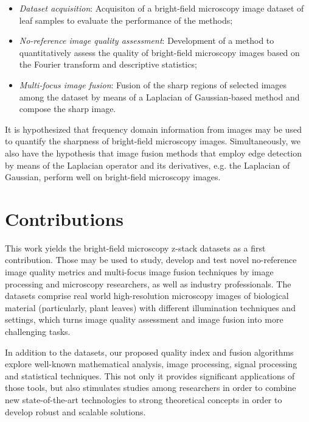\begin{itemize}
    \item \emph{Dataset acquisition}: Acquisiton of a bright-field microscopy image dataset of leaf samples to evaluate the performance of the methods;

    \item \emph{No-reference image quality assessment}: Development of a method to quantitatively assess the quality of bright-field microscopy images based on the Fourier transform and descriptive statistics; 
    
    \item \emph{Multi-focus image fusion}: Fusion of the sharp regions of selected images among the dataset by means of a Laplacian of Gaussian-based method and compose the sharp image.
    
\end{itemize}

It is hypothesized that frequency domain information from images may be used to quantify the sharpness of bright-field microscopy images. Simultaneously, we also have the hypothesis that image fusion methods that employ edge detection by means of the Laplacian operator and its derivatives, e.g. the Laplacian of Gaussian, perform well on bright-field microscopy images. 

\section{Contributions}

This work yields the bright-field microscopy z-stack datasets as a first contribution. Those may be used to study, develop and test novel no-reference image quality metrics and multi-focus image fusion techniques by image processing and microscopy researchers, as well as industry professionals. The datasets comprise real world high-resolution microscopy images of biological material (particularly, plant leaves) with different illumination techniques and settings, which turns image quality assessment and image fusion into more challenging tasks.

In addition to the datasets, our proposed quality index and fusion algorithms explore well-known mathematical analysis, image processing, signal processing and statistical techniques. This not only it provides significant applications of those tools, but also stimulates studies among researchers in order to combine new state-of-the-art technologies to strong theoretical concepts in order to develop robust and scalable solutions.

